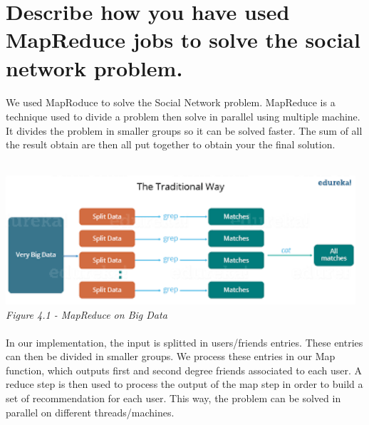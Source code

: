 \pagebreak
\section{Describe how you have used MapReduce jobs to solve the social network problem.} \label{T4}

\paragraph{}We used MapRoduce to solve the Social Network problem. MapReduce is a technique used to divide a problem then solve in parallel using multiple machine. It divides the problem in smaller groups so it can be solved faster. The sum of all the result obtain are then all put together to obtain your the final solution.\\
\\
\begin{center}
\includegraphics[width=13cm]{Resources/MapReduce.png}\\
\emph{Figure 4.1 - MapReduce on Big Data}
\end{center}
\paragraph{}In our implementation, the input is splitted in users/friends entries. These entries can then be divided in smaller groups. We process these entries in our Map function, which outputs first and second degree friends associated to each user. A reduce step is then used to process the output of the map step in order to build a set of recommendation for each user. This way, the problem can be solved in parallel on different threads/machines.